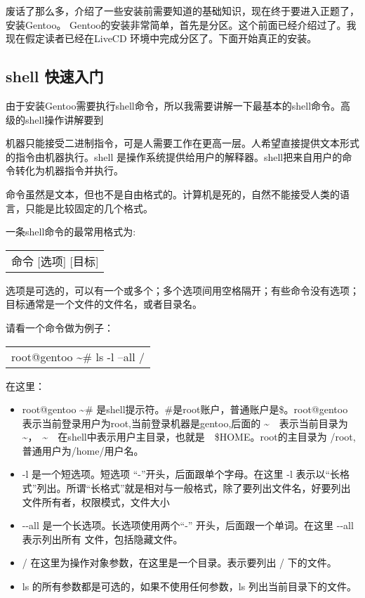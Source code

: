 \documentclass[amstex,twoside]{ctexbook}
\newenvironment{code}{\small\tt\begin{longtable}{p{0.8\textwidth}}}{\end{longtable}}
\begin{document}
废话了那么多，介绍了一些安装前需要知道的基础知识，现在终于要进入正题了，安装Gentoo。
Gentoo的安装非常简单，首先是分区。这个前面已经介绍过了。我现在假定读者已经在LiveCD 环境中完成分区了。下面开始真正的安装。


\subsection{shell 快速入门}

由于安装Gentoo需要执行shell命令，所以我需要讲解一下最基本的shell命令。高级的shell操作讲解要到

机器只能接受二进制指令，可是人需要工作在更高一层。人希望直接提供文本形式的指令由机器执行。shell 是操作系统提供给用户的解释器。shell把来自用户的命令转化为机器指令并执行。

命令虽然是文本，但也不是自由格式的。计算机是死的，自然不能接受人类的语言，只能是比较固定的几个格式。

一条shell命令的最常用格式为:

\begin{code}
命令 [选项] [目标]
\end{code}

选项是可选的，可以有一个或多个；多个选项间用空格隔开；有些命令没有选项；目标通常是一个文件的文件名，或者目录名。

请看一个命令做为例子： 

\begin{code}
root@gentoo \textasciitilde \# ls -l --all /  
\end{code}
在这里：

\begin{itemize}
\item root@gentoo \textasciitilde \# 是shell提示符。\#是root账户，普通账户是\$。root@gentoo 表示当前登录用户为root,当前登录机器是gentoo,后面的 \textasciitilde　表示当前目录为　\textasciitilde，　\textasciitilde　在shell中表示用户主目录，也就是　\$HOME。root的主目录为 /root,　普通用户为/home/用户名。
\item -l 是一个短选项。短选项 “-”开头，后面跟单个字母。在这里 -l 表示以“长格式”列出。所谓“长格式”就是相对与一般格式，除了要列出文件名，好要列出文件所有者，权限模式，文件大小
\item -{}-all 是一个长选项。长选项使用两个“-” 开头，后面跟一个单词。在这里 -{}-all 表示列出所有 文件，包括隐藏文件。
\item / 在这里为操作对象参数，在这里是一个目录。表示要列出 / 下的文件。
\item ls 的所有参数都是可选的，如果不使用任何参数，ls 列出当前目录下的文件。

\end{itemize}
\end{document}

